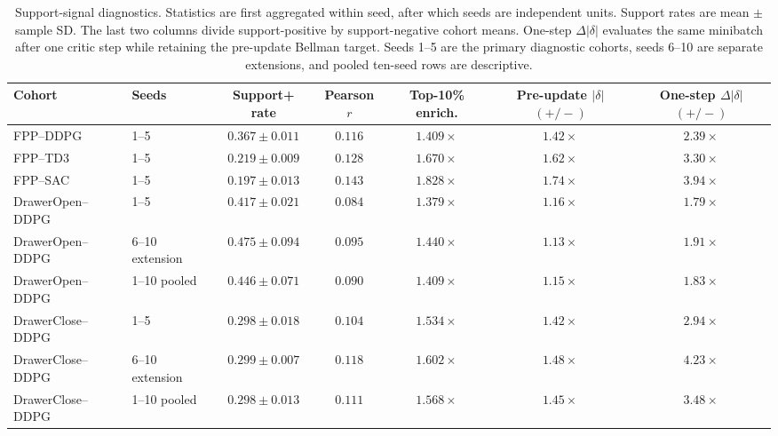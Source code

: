 \begin{table}[t]
\centering
\small
\setlength{\tabcolsep}{3.5pt}
\begin{tabular}{llccccc}
\toprule
Cohort & Seeds & Support+ rate & Pearson \(r\) & Top-10\% enrich. &
Pre-update \(|\delta|\) \((+/-)\) & One-step \(\Delta|\delta|\) \((+/-)\) \\
\midrule
FPP--DDPG & 1--5 & \(0.367\pm0.011\) & \(0.116\) & \(1.409\times\) &
\(1.42\times\) & \(2.39\times\) \\
FPP--TD3 & 1--5 & \(0.219\pm0.009\) & \(0.128\) & \(1.670\times\) &
\(1.62\times\) & \(3.30\times\) \\
FPP--SAC & 1--5 & \(0.197\pm0.013\) & \(0.143\) & \(1.828\times\) &
\(1.74\times\) & \(3.94\times\) \\
\addlinespace[2pt]
DrawerOpen--DDPG & 1--5 & \(0.417\pm0.021\) & \(0.084\) & \(1.379\times\) &
\(1.16\times\) & \(1.79\times\) \\
DrawerOpen--DDPG & 6--10 extension & \(0.475\pm0.094\) & \(0.095\) &
\(1.440\times\) & \(1.13\times\) & \(1.91\times\) \\
DrawerOpen--DDPG & 1--10 pooled & \(0.446\pm0.071\) & \(0.090\) &
\(1.409\times\) & \(1.15\times\) & \(1.83\times\) \\
\addlinespace[2pt]
DrawerClose--DDPG & 1--5 & \(0.298\pm0.018\) & \(0.104\) & \(1.534\times\) &
\(1.42\times\) & \(2.94\times\) \\
DrawerClose--DDPG & 6--10 extension & \(0.299\pm0.007\) & \(0.118\) &
\(1.602\times\) & \(1.48\times\) & \(4.23\times\) \\
DrawerClose--DDPG & 1--10 pooled & \(0.298\pm0.013\) & \(0.111\) &
\(1.568\times\) & \(1.45\times\) & \(3.48\times\) \\
\bottomrule
\end{tabular}
\caption{Support-signal diagnostics. Statistics are first aggregated within
seed, after which seeds are independent units. Support rates are mean
\(\pm\) sample SD. The last two columns divide support-positive by
support-negative cohort means. One-step \(\Delta|\delta|\) evaluates the same
minibatch after one critic step while retaining the pre-update Bellman target.
Seeds 1--5 are the primary diagnostic cohorts, seeds 6--10 are separate
extensions, and pooled ten-seed rows are descriptive.}
\label{tab:supp-support-signal-diagnostics}
\end{table}
